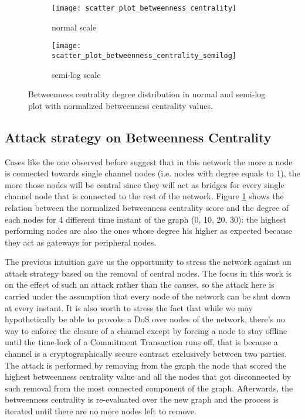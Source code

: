	\begin{figure}
		\centering
		\begin{subfigure}{0.8\textwidth}
			\centering
			\texttt{[image: scatter\_plot\_betweenness\_centrality]}
			\caption{normal scale}
		\end{subfigure}
		\begin{subfigure}{0.8\textwidth}
			\centering
			\texttt{[image: scatter\_plot\_betweenness\_centrality\_semilog]}
			\caption{semi-log scale}
		\end{subfigure}
		\caption{Betweenness centrality degree distribution in normal and semi-log plot with normalized betweenness centrality values. }
		\label{betweenness_centrality_degree}
	\end{figure}
	
	\subsection{Attack strategy on Betweenness Centrality}
	
	Cases like the one observed before suggest that in this network the more a node is connected towards single channel nodes (i.e. nodes with degree equals to 1), the more those nodes will be central since they will act as bridges for every single channel node that is connected to the rest of the network. Figure \ref{betweenness_centrality_degree} shows the relation between the normalized betweenness centrality score and the degree of each nodes for 4 different time instant of the graph (0, 10, 20, 30): the highest performing nodes are also the ones whose degree his higher as expected because they act as gateways for peripheral nodes. 
	
	The previous intuition gave us the opportunity to stress the network against an attack strategy based on the removal of central nodes. The focus in this work is on the effect of such an attack rather than the causes, so the attack here is carried under the assumption that every node of the network can be shut down at every instant. It is also worth to stress the fact that while we may hypothetically be able to provoke a DoS over nodes of the network, there's no way to enforce the closure of a channel except by forcing a node to stay offline until the time-lock of a Commitment Transaction runs off, that is because a channel is a cryptographically secure contract exclusively between two parties. The attack is performed by removing from the graph the node that scored the highest betweenness centrality value and all the nodes that got disconnected by such removal from the most connected component of the graph. Afterwards, the betweenness centrality is re-evaluated over the new graph and the process is iterated until there are no more nodes left to remove. 
	
